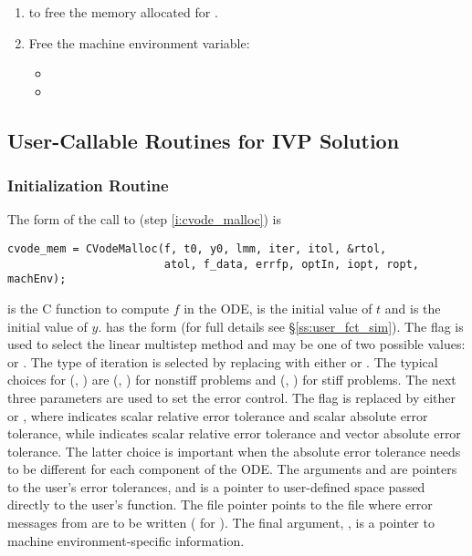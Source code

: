 \begin{enumerate}
\item {} to free the memory allocated for {\cvodes}.
  
\item Free the machine environment variable:
  \begin{itemize}
  \item {\s}
  \item {\p}
  \end{itemize}
  
\end{enumerate}

\subsection{User-Callable Routines for IVP Solution}
\label{ss:cvodes_fct_sim}

\subsubsection{{\cvodes} Initialization Routine}\label{sss:cvodemalloc}

The form of the call to  (step \ref{i:cvode_malloc}) is
\begin{verbatim}
cvode_mem = CVodeMalloc(f, t0, y0, lmm, iter, itol, &rtol, 
                        atol, f_data, errfp, optIn, iopt, ropt, machEnv);
\end{verbatim}
 is the C function to compute $f$ in the ODE,  is the initial
value of $t $ and  is the initial value of $y$. 
 has the form  (for full details
see \S\ref{ss:user_fct_sim}).
The flag  is used to select the linear multistep method and may be one of two
possible values:  or . The type of iteration is
selected by replacing  with either  or 
. The typical choices for (, ) are
(, ) for nonstiff problems and
(, ) for stiff problems.
The next three parameters are used to set the error control. 
The flag  is replaced by either  or 
, where  indicates scalar relative error tolerance and
scalar absolute error tolerance, while  indicates scalar
relative error tolerance and vector absolute error tolerance. The
latter choice is important when the absolute error tolerance needs to
be different for each component of the ODE. The arguments 
and  are pointers to the user's error tolerances, and 
 is a pointer to user-defined space passed directly to
the user's  function. The file pointer  points to
the file where error messages from {\cvodes} are to be written 
( for ). 
The final argument, , is a pointer to machine 
environment-specific information.

